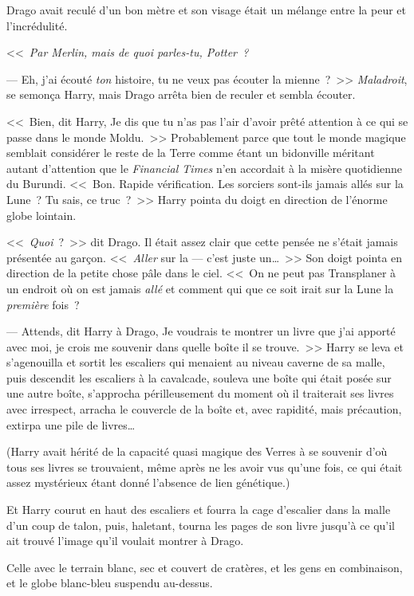 Drago avait reculé d'un bon mètre et son visage était un mélange entre la peur et l'incrédulité.

<<~\emph{Par Merlin, mais de quoi parles-tu, Potter~?}

--- Eh, j'ai écouté \emph{ton} histoire, tu ne veux pas écouter la mienne~?~>> \emph{Maladroit}, se semonça Harry, mais Drago arrêta bien de reculer et sembla écouter.

<<~Bien, dit Harry, Je dis que tu n'as pas l'air d'avoir prêté attention à ce qui se passe dans le monde Moldu.~>> Probablement parce que tout le monde magique semblait considérer le reste de la Terre comme étant un bidonville méritant autant d'attention que le \emph{Financial Times} n'en accordait à la misère quotidienne du Burundi. <<~Bon. Rapide vérification. Les sorciers sont-ils jamais allés sur la Lune~? Tu sais, ce truc~?~>> Harry pointa du doigt en direction de l'énorme globe lointain.

<<~\emph{Quoi}~?~>> dit Drago. Il était assez clair que cette pensée ne s'était jamais présentée au garçon. <<~\emph{Aller} sur la — c'est juste un…~>> Son doigt pointa en direction de la petite chose pâle dans le ciel. <<~On ne peut pas Transplaner à un endroit où on est jamais \emph{allé} et comment qui que ce soit irait sur la Lune la \emph{première} fois~?

--- Attends, dit Harry à Drago, Je voudrais te montrer un livre que j'ai apporté avec moi, je crois me souvenir dans quelle boîte il se trouve.~>> Harry se leva et s'agenouilla et sortit les escaliers qui menaient au niveau caverne de sa malle, puis descendit les escaliers à la cavalcade, souleva une boîte qui était posée sur une autre boîte, s'approcha périlleusement du moment où il traiterait ses livres avec irrespect, arracha le couvercle de la boîte et, avec rapidité, mais précaution, extirpa une pile de livres…

(Harry avait hérité de la capacité quasi magique des Verres à se souvenir d'où tous ses livres se trouvaient, même après ne les avoir vus qu'une fois, ce qui était assez mystérieux étant donné l'absence de lien génétique.)

Et Harry courut en haut des escaliers et fourra la cage d'escalier dans la malle d'un coup de talon, puis, haletant, tourna les pages de son livre jusqu'à ce qu'il ait trouvé l'image qu'il voulait montrer à Drago.

Celle avec le terrain blanc, sec et couvert de cratères, et les gens en combinaison, et le globe blanc-bleu suspendu au-dessus.

